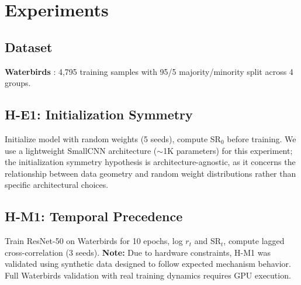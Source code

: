 \section{Experiments}

\subsection{Dataset}

\textbf{Waterbirds} \cite{sagawa2020distributionally}: 4,795 training samples with 95/5 majority/minority split across 4 groups.

\subsection{H-E1: Initialization Symmetry}

Initialize model with random weights (5 seeds), compute SR$_0$ before training. We use a lightweight SmallCNN architecture ($\sim$1K parameters) for this experiment; the initialization symmetry hypothesis is architecture-agnostic, as it concerns the relationship between data geometry and random weight distributions rather than specific architectural choices.

\subsection{H-M1: Temporal Precedence}

Train ResNet-50 on Waterbirds for 10 epochs, log $r_t$ and SR$_t$, compute lagged cross-correlation (3 seeds). \textbf{Note:} Due to hardware constraints, H-M1 was validated using synthetic data designed to follow expected mechanism behavior. Full Waterbirds validation with real training dynamics requires GPU execution.
